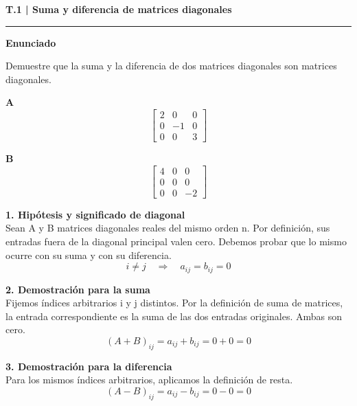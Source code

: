 \documentclass[11pt,a4paper,landscape]{article}
\newcommand{\titulo}[1]{{\LARGE\bfseries #1}\par\smallskip\hrule\medskip}
\begin{document}
\newpage{}\hypertarget{1.2-T.1}{}
\titulo{T.1 | Suma y diferencia de matrices diagonales}
\textbf{Enunciado}\par Demuestre que la suma y la diferencia de dos matrices diagonales son matrices diagonales.
\par\smallskip \begin{minipage}[t]{.47\linewidth}\centering \textbf{A}\[\begin{bmatrix}2 & 0 & 0\\0 & -1 & 0\\0 & 0 & 3\end{bmatrix}\]\end{minipage}\hfill\begin{minipage}[t]{.47\linewidth}\centering \textbf{B}\[\begin{bmatrix}4 & 0 & 0\\0 & 0 & 0\\0 & 0 & -2\end{bmatrix}\]\end{minipage}\par\smallskip
\par\medskip\large
\noindent\begin{minipage}{\linewidth}\textbf{1. Hipótesis y significado de diagonal}\\[2pt]Sean A y B matrices diagonales reales del mismo orden n. Por definición, sus entradas fuera de la diagonal principal valen cero. Debemos probar que lo mismo ocurre con su suma y con su diferencia.
\[i\ne j\quad\Longrightarrow\quad a_{ij}=b_{ij}=0\]
\end{minipage}\par\medskip
\noindent\begin{minipage}{\linewidth}\textbf{2. Demostración para la suma}\\[2pt]Fijemos índices arbitrarios i y j distintos. Por la definición de suma de matrices, la entrada correspondiente es la suma de las dos entradas originales. Ambas son cero.
\[(A+B)_{ij}=a_{ij}+b_{ij}=0+0=0\]
\end{minipage}\par\medskip
\noindent\begin{minipage}{\linewidth}\textbf{3. Demostración para la diferencia}\\[2pt]Para los mismos índices arbitrarios, aplicamos la definición de resta.
\[(A-B)_{ij}=a_{ij}-b_{ij}=0-0=0\]
\end{minipage}\par\medskip
\end{document}
